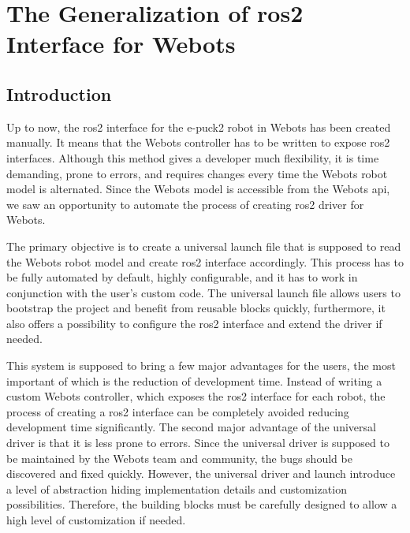 \chapter{The Generalization of \ac{ros2} Interface for Webots}
\label{chap:generalization}


\section{Introduction}
\label{sec:generalization:introduction}

Up to now, the \ac{ros2} interface for the e-puck2 robot in Webots has been created manually.
It means that the Webots controller has to be written to expose \ac{ros2} interfaces.
Although this method gives a developer much flexibility, it is time demanding, prone to errors, and requires changes every time the Webots robot model is alternated.
Since the Webots model is accessible from the Webots \ac{api}, we saw an opportunity to automate the process of creating \ac{ros2} driver for Webots.

The primary objective is to create a universal launch file that is supposed to read the Webots robot model and create \ac{ros2} interface accordingly.
This process has to be fully automated by default, highly configurable, and it has to work in conjunction with the user's custom code.
The universal launch file allows users to bootstrap the project and benefit from reusable blocks quickly, furthermore, it also offers a possibility to configure the \ac{ros2} interface and extend the driver if needed.

This system is supposed to bring a few major advantages for the users, the most important of which is the reduction of development time.
Instead of writing a custom Webots controller, which exposes the \ac{ros2} interface for each robot, the process of creating a \ac{ros2} interface can be completely avoided reducing development time significantly.
The second major advantage of the universal driver is that it is less prone to errors.
Since the universal driver is supposed to be maintained by the Webots team and community, the bugs should be discovered and fixed quickly.
However, the universal driver and launch introduce a level of abstraction hiding implementation details and customization possibilities.
Therefore, the building blocks must be carefully designed to allow a high level of customization if needed.

